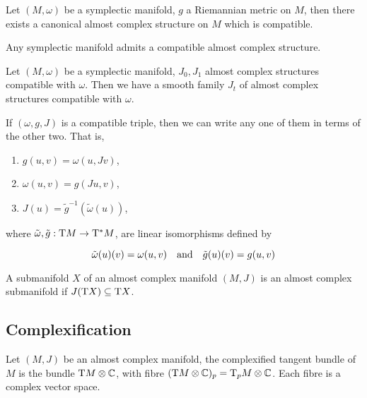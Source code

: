 \begin{proposition}
    Let \((M, \omega)\) be a symplectic manifold, \(g\) a Riemannian metric on \(M\), then there exists a canonical almost complex structure on \(M\) which is compatible.
\end{proposition}

\begin{corollary}
    Any symplectic manifold admits a compatible almost complex structure.
\end{corollary}

\begin{proposition}
    Let \((M, \omega)\) be a symplectic manifold, \(J_0, J_1\) almost complex structures compatible with \(\omega\). Then we have a smooth family \(J_t\) of almost complex structures compatible with \(\omega\).
\end{proposition}

\begin{proposition}
    If \((\omega, g, J)\) is a compatible triple, then we can write any one of them in terms of the other two. That is,

    \begin{enumerate}
        \item \(g(u, v) = \omega(u, Jv)\),
        \item \(\omega(u,v) = g(Ju, v)\),
        \item \(J(u) = \tilde g^{-1}(\tilde\omega(u))\),
    \end{enumerate}

    where \(\tilde\omega, \tilde g : \mathrm{T} M \to \mathrm{T}^* M\), are linear isomorphisms defined by

    \[\tilde\omega(u)(v) = \omega(u,v) \qqtext{and}\tilde g(u)(v) = g(u, v)\]
\end{proposition}

\begin{definition}
     A submanifold \(X\) of an almost complex manifold \((M, J)\) is an almost complex submanifold if \(J(\mathrm{T} X) \subseteq \mathrm{T} X\).
\end{definition}

\subsection{Complexification}

\begin{definition}

    Let \((M, J)\) be an almost complex manifold, the complexified tangent bundle of \(M\) is the bundle \(\mathrm{T} M \otimes \mathbb{C}\), with fibre \((\mathrm{T} M \otimes \mathbb{C})_p = \mathrm{T}_pM \otimes \mathbb{C}\). Each fibre is a complex vector space.
\end{definition}

